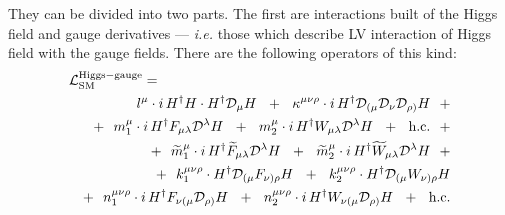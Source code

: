 \documentclass[12pt,preprintnumbers,nofootinbib]{revtex4}
\newcommand{\wt}{\widetilde}
\newcommand{\md}{\mathcal{D}}
\begin{document}
	They can be divided into two parts. 
	The first are interactions built of the Higgs field and gauge 
	derivatives
	--- {\it i.e.} those which describe LV interaction of Higgs field with
	the gauge fields.
	There are the following operators of this kind:
\begin{eqnarray*}
\nonumber
\lefteqn{
	\mathcal{L}_{\rm SM}^{\rm Higgs-gauge} =
	}
	\\
\nonumber
	&&
	\phantom{+~~}
	l^\mu \cdot
	i\, 
	H^\dag H \cdot H^\dag \md_\mu H
	~~+~~
	\kappa^{\mu\nu\rho} \cdot
	i\, 
	H^\dag \md_{(\mu} \md_\nu \md_{\rho)} H
	~~+
	\\
\nonumber
	&&
	+~~
	m^\mu_1 \cdot
	i\, 
	H^\dag F_{\mu\lambda} \md^\lambda H
	~~+~~
	m^\mu_2 \cdot
	i\, 
	H^\dag W_{\mu\lambda} \md^\lambda H
	~~+~~
	\text{h.c.}
	~~+
	\\
\nonumber
	&&
	+~~
	\wt{m}^\mu_1 \cdot
	i\, 
	H^\dag \wt{F}_{\mu\lambda} \md^\lambda H
	~~+~~
	\wt{m}^\mu_2 \cdot
	i\, 
	H^\dag \wt{W}_{\mu\lambda} \md^\lambda H
	~~+
	\\
\nonumber
	&&
	+~~
	k^{\mu\nu\rho}_{1} \cdot
	H^\dag \md_{(\mu} F_{\nu)\rho} H
	~~+~~
	k^{\mu\nu\rho}_{2} \cdot
	H^\dag \md_{(\mu} W_{\nu)\rho} H
	\\
\nonumber
	&&
	+~~
	n^{\mu\nu\rho}_{1} \cdot
	i\, 
	H^\dag F_{\nu(\mu} \md_{\rho)} H
	~~+~~
	n^{\mu\nu\rho}_{2} \cdot
	i\, 
	H^\dag W_{\nu(\mu} \md_{\rho)}  H
	~~+~~
	\text{h.c.}
\end{eqnarray*}
\end{document}

